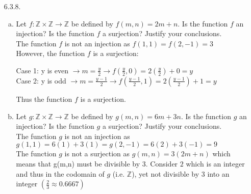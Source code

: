 \documentclass[11pt]{article}
\newcommand{\Z}{\mathbb Z}
\begin{document}
\begin{itemize}
\begin{enumerate}[(a)]
\end{enumerate}

\hrulefill


\item[6.3.8.] 
\begin{enumerate}[(a)]
\item Let $f:\Z\times \Z\to\Z$ be defined by $f(m,n)=2m+n$. Is the function $f$ an injection? Is the function $f$ a surjection? Justify your conclusions.\\
The function $f$ is not an injection as $f(1,1) = f(2,-1) = 3$\\
However, the function $f$ is a surjection:
\begin{center}
    Case 1: y is even $\rightarrow m = \frac{y}{2}\rightarrow f(\frac{y}{2},0) = 2(\frac{y}{2})+0 = y$\\
    Case 2: y is odd $\rightarrow m = \frac{y-1}{2}\rightarrow f(\frac{y-1}{2},1) = 2(\frac{y-1}{2})+1 = y$
\end{center}
Thus the function $f$ is a surjection.
\item Let $g:\Z\times \Z \to\Z$ be defined by $g(m,n)=6m+3n$. Is the function $g$ an injection? Is the function $g$ a surjection? Justify your conclusions.\\
\indent The function $g$ is not an injection as $g(1,1) = 6(1)+3(1) = g(2,-1) = 6(2)+3(-1) = 9$\\
The function $g$ is not a surjection as $g(m,n) = 3(2m+n)$ which means that g(m,n) must be divisible by 3.
Consider $2$ which is an integer and thus in the codomain of $g$ (i.e. $\Z$), yet not divisible by $3$ into an integer $(\frac{2}{3} \approx 0.6667)$
\end{enumerate}
\end{itemize}
\end{document}
